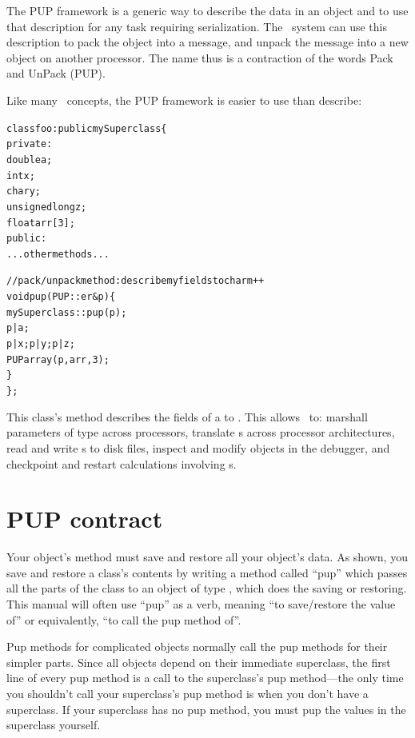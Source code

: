 \label{sec:pup}

The  PUP framework is a generic way to describe the data in an object and to use that description for any task requiring serialization.
The \charmpp\ system can use this description to pack the object 
into a message, and unpack the message into a new object on another 
processor. 
The name thus is a contraction of the words Pack and UnPack (PUP). 

Like many \CC\ concepts, the PUP framework is easier to use than 
describe: 

\begin{alltt}
class foo : public mySuperclass \{
 private:
    double a;
    int x;
    char y;
    unsigned long z;
    float arr[3];
 public:
    ...other methods...

    //pack/unpack method: describe my fields to charm++
    void pup(PUP::er &p) \{
      mySuperclass::pup(p);
      p|a;
      p|x; p|y; p|z;
      PUParray(p,arr,3);
    \}
\};
\end{alltt}

This class's  method describes the fields of a  to \charmpp{}.
This allows \charmpp\ to: marshall parameters of type  across processors,
translate s across processor architectures, read and write s
to disk files, inspect and modify  objects in the debugger, and 
checkpoint and restart calculations involving s.



\section{PUP contract}

\label{sec:pupcontract}
Your object's  method must save and restore all your object's
data.  As shown, you save and restore a class's contents by writing a
method called ``pup'' which passes all the parts of the class to an
object of type  , which does the saving or
restoring.  This manual will often use ``pup'' as a verb, meaning ``to
save/restore the value of'' or equivalently, ``to call the pup method
of''.

Pup methods for complicated objects normally call the pup methods
for their simpler parts.  Since all objects depend on their immediate
superclass, the first line of every pup method is a call to the 
superclass's pup method---the only time you shouldn't call your superclass's
pup method is when you don't have a superclass.  If your superclass has
no pup method, you must pup the values in the superclass yourself.


